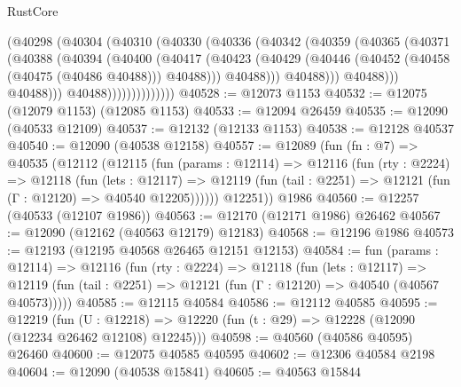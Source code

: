 \begin{lexlean}{RustCore}
\begin{coremodule}
                            (@40298
                              (@40304
                                (@40310
                                  (@40330
                                    (@40336
                                      (@40342
                                        (@40359
                                          (@40365
                                            (@40371
                                              (@40388
                                                (@40394
                                                  (@40400
                                                    (@40417
                                                      (@40423
                                                        (@40429
                                                          (@40446
                                                            (@40452
                                                              (@40458 (@40475 (@40486 @40488)))
                                                              @40488)))
                                                        @40488)))
                                                  @40488)))
                                            @40488)))
                                      @40488)))
                                @40488))))))))))))))
@40528 := @12073 @1153
@40532 := @12075 (@12079 @1153) (@12085 @1153)
@40533 := @12094 @26459
@40535 := @12090 (@40533 @12109)
@40537 := @12132 (@12133 @1153)
@40538 := @12128 @40537
@40540 := @12090 (@40538 @12158)
@40557 := @12089
    (fun (fn : @7) =>
    @40535
      (@12112
        (@12115
          (fun (params : @12114) =>
          @12116
            (fun (rty : @2224) =>
            @12118
              (fun (lets : @12117) =>
              @12119 (fun (tail : @2251) => @12121 (fun (Γ : @12120) => @40540 @12205))))))
        @12251))
    @1986
@40560 := @12257 (@40533 (@12107 @1986))
@40563 := @12170 (@12171 @1986) @26462
@40567 := @12090 (@12162 (@40563 @12179) @12183)
@40568 := @12196 @1986
@40573 := @12193 (@12195 @40568 @26465 @12151 @12153)
@40584 := fun (params : @12114) =>
  @12116
    (fun (rty : @2224) =>
    @12118
      (fun (lets : @12117) =>
      @12119 (fun (tail : @2251) => @12121 (fun (Γ : @12120) => @40540 (@40567 @40573)))))
@40585 := @12115 @40584
@40586 := @12112 @40585
@40595 := @12219
    (fun (U : @12218) => @12220 (fun (t : @29) => @12228 (@12090 (@12234 @26462 @12108) @12245)))
@40598 := @40560 (@40586 @40595) @26460
@40600 := @12075 @40585 @40595
@40602 := @12306 @40584 @2198
@40604 := @12090 (@40538 @15841)
@40605 := @40563 @15844

\end{coremodule}
\end{lexlean}
